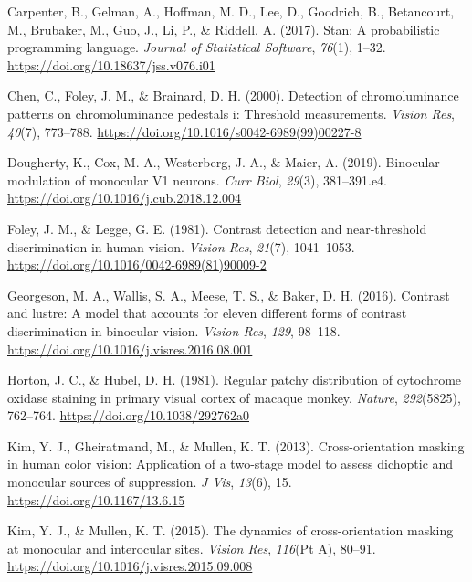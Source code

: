 \documentclass[
]{article}
\newlength{\cslhangindent}
\newlength{\cslentryspacingunit} %
\newenvironment{CSLReferences}[2] %
 {%
  \setlength{\parindent}{0pt}
  \ifodd #1
  \let\oldpar\par
  \def\par{\hangindent=\cslhangindent\oldpar}
  \fi
  \setlength{\parskip}{#2\cslentryspacingunit}
 }%
 {}
\begin{document}
\begin{CSLReferences}{1}{0}
\leavevmode{}%
Carpenter, B., Gelman, A., Hoffman, M. D., Lee, D., Goodrich, B., Betancourt, M., Brubaker, M., Guo, J., Li, P., \& Riddell, A. (2017). Stan: A probabilistic programming language. \emph{Journal of Statistical Software}, \emph{76}(1), 1--32. \url{https://doi.org/10.18637/jss.v076.i01}

\leavevmode{}%
Chen, C., Foley, J. M., \& Brainard, D. H. (2000). Detection of chromoluminance patterns on chromoluminance pedestals i: Threshold measurements. \emph{Vision Res}, \emph{40}(7), 773--788. \url{https://doi.org/10.1016/s0042-6989(99)00227-8}

\leavevmode{}%
Dougherty, K., Cox, M. A., Westerberg, J. A., \& Maier, A. (2019). Binocular modulation of monocular V1 neurons. \emph{Curr Biol}, \emph{29}(3), 381--391.e4. \url{https://doi.org/10.1016/j.cub.2018.12.004}

\leavevmode{}%
Foley, J. M., \& Legge, G. E. (1981). Contrast detection and near-threshold discrimination in human vision. \emph{Vision Res}, \emph{21}(7), 1041--1053. \url{https://doi.org/10.1016/0042-6989(81)90009-2}

\leavevmode{}%
Georgeson, M. A., Wallis, S. A., Meese, T. S., \& Baker, D. H. (2016). Contrast and lustre: A model that accounts for eleven different forms of contrast discrimination in binocular vision. \emph{Vision Res}, \emph{129}, 98--118. \url{https://doi.org/10.1016/j.visres.2016.08.001}

\leavevmode{}%
Horton, J. C., \& Hubel, D. H. (1981). Regular patchy distribution of cytochrome oxidase staining in primary visual cortex of macaque monkey. \emph{Nature}, \emph{292}(5825), 762--764. \url{https://doi.org/10.1038/292762a0}

\leavevmode{}%
Kim, Y. J., Gheiratmand, M., \& Mullen, K. T. (2013). Cross-orientation masking in human color vision: Application of a two-stage model to assess dichoptic and monocular sources of suppression. \emph{J Vis}, \emph{13}(6), 15. \url{https://doi.org/10.1167/13.6.15}

\leavevmode{}%
Kim, Y. J., \& Mullen, K. T. (2015). The dynamics of cross-orientation masking at monocular and interocular sites. \emph{Vision Res}, \emph{116}(Pt A), 80--91. \url{https://doi.org/10.1016/j.visres.2015.09.008}


\end{CSLReferences}
\end{document}
